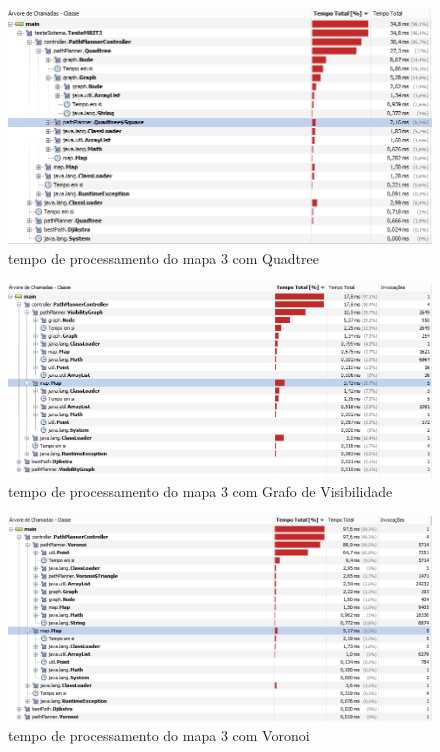 \begin{figure}[h]
	\centering
	\label{fig47}
		\includegraphics[keepaspectratio=true,scale=0.6]{figuras/quad3.PNG}
	\caption{tempo de processamento do mapa 3 com Quadtree}
\end{figure}

\begin{figure}[h]
	\centering
	\label{fig48}
		\includegraphics[keepaspectratio=true,scale=0.6]{figuras/visib3.PNG}
	\caption{tempo de processamento do mapa 3 com Grafo de Visibilidade}
\end{figure}

\begin{figure}[h]
	\centering
	\label{fig49}
		\includegraphics[keepaspectratio=true,scale=0.6]{figuras/voronoi3.PNG}
	\caption{tempo de processamento do mapa 3 com Voronoi}
\end{figure}

